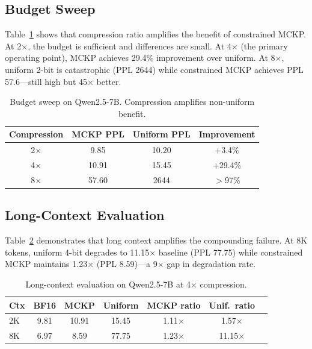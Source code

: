 \documentclass[11pt,a4paper]{article}
\begin{document}
\subsection{Budget Sweep}
\label{sec:budget}

Table~\ref{tab:budget} shows that compression ratio amplifies the benefit of constrained MCKP.
At 2$\times$, the budget is sufficient and differences are small.
At 4$\times$ (the primary operating point), MCKP achieves 29.4\% improvement over uniform.
At 8$\times$, uniform 2-bit is catastrophic (PPL 2644) while constrained MCKP achieves PPL 57.6---still high but 45$\times$ better.

\begin{table}[t]
\centering
\small
\caption{Budget sweep on Qwen2.5-7B. Compression amplifies non-uniform benefit.}
\label{tab:budget}
\begin{tabular}{@{}cccc@{}}
\toprule
\textbf{Compression} & \textbf{MCKP PPL} & \textbf{Uniform PPL} & \textbf{Improvement} \\
\midrule
2$\times$ & 9.85 & 10.20 & +3.4\% \\
4$\times$ & 10.91 & 15.45 & +29.4\% \\
8$\times$ & 57.60 & 2644 & $>$97\% \\
\bottomrule
\end{tabular}
\end{table}


\subsection{Long-Context Evaluation}
\label{sec:longctx}

Table~\ref{tab:longctx} demonstrates that long context amplifies the compounding failure.
At 8K tokens, uniform 4-bit degrades to 11.15$\times$ baseline (PPL 77.75) while constrained MCKP maintains 1.23$\times$ (PPL 8.59)---a 9$\times$ gap in degradation rate.

\begin{table}[t]
\centering
\small
\caption{Long-context evaluation on Qwen2.5-7B at 4$\times$ compression.}
\label{tab:longctx}
\begin{tabular}{@{}lcccccc@{}}
\toprule
\textbf{Ctx} & \textbf{BF16} & \textbf{MCKP} & \textbf{Uniform} & \textbf{MCKP ratio} & \textbf{Unif.\ ratio} \\
\midrule
2K & 9.81 & 10.91 & 15.45 & 1.11$\times$ & 1.57$\times$ \\
8K & 6.97 & 8.59 & 77.75 & 1.23$\times$ & 11.15$\times$ \\
\bottomrule
\end{tabular}
\end{table}
\end{document}
